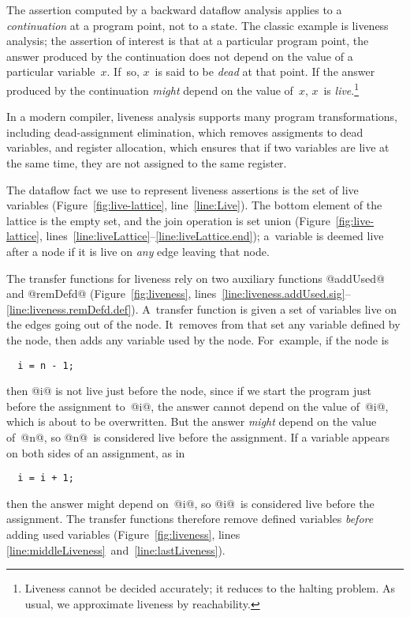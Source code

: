 \documentclass[blockstyle,preprint,natbib,nocopyrightspace]{sigplanconf}
\newcommand\lineref[1]{line~\ref{line:#1}}
\newcommand\linepairref[2]{lines \ref{line:#1}~and~\ref{line:#2}}
\newcommand\linerangeref[2]{\mbox{lines~\ref{line:#1}--\ref{line:#2}}}
\newcommand\seclabel[1]{\label{sec:#1}}
\newcommand\figref[1]{Figure~\ref{fig:#1}}
\begin{document}
\seclabel{liveness}

The assertion computed by 
a backward dataflow analysis applies to a
\emph{continuation} at a program point, not to a state.
The classic example is liveness analysis;
the assertion of interest is that at a particular program point,
the answer produced by the continuation does not depend on
the value of a particular variable~$x$.
If~so, $x$~is said to be \emph{dead} at that point.
If the answer produced by the continuation \emph{might} depend on the
value of~$x$, $x$~is \emph{live}.\footnote
{Liveness cannot be decided accurately; it reduces to the halting problem.
As usual, we approximate liveness by reachability.}

In a modern compiler, liveness analysis supports many program
transformations,
including
dead-assignment elimination,
which removes assigments to dead variables, 
and register allocation, which
ensures that if two variables are 
live at the same time, they are not assigned to the same register. 

The dataflow fact we use to represent liveness assertions is the set of
live variables (\figref{live-lattice}, \lineref{Live}).
The bottom element of the lattice is the empty set, and the join
operation is set union (\figref{live-lattice},
\linerangeref{liveLattice}{liveLattice.end}); 
a~variable is deemed live after a node if it is live on \emph{any} edge leaving that
node.

The transfer functions for liveness rely on two auxiliary functions
@addUsed@ and @remDefd@ (\figref{liveness}, 
\linerangeref{liveness.addUsed.sig}{liveness.remDefd.def}).
A~transfer function is given a set of variables live on the edges
going out of the node.
It~removes from that set any variable
defined by the node, then adds any variable used by the
node.
For~example, if the node is
\begin{verbatim}
  i = n - 1;
\end{verbatim}
then @i@ is not live just before the node, since if we start the
program just before the assignment to~@i@, the answer cannot 
depend on the value of~@i@, which is about to be overwritten.
But the answer \emph{might} depend on the value of~@n@, so
@n@~is considered live before the assignment.
If a variable appears on both sides of an
assignment, as in \ifpagetuning{\looseness=-1 \par}\fi
\begin{verbatim}
  i = i + 1;
\end{verbatim}
then the answer might depend on~@i@, so @i@~is considered live
before the assignment.
The transfer functions
therefore
remove defined variables \emph{before} adding used variables
(\figref{liveness}, \linepairref{middleLiveness}{lastLiveness}). 
\end{document}
